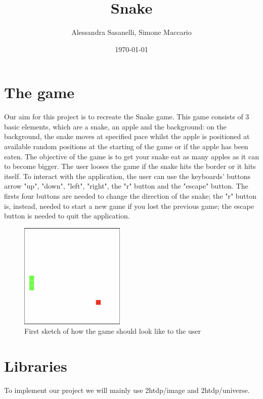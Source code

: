 \documentclass{article}
\title{Snake}
\author{Alessandra Sasanelli, Simone Maccario}
\date{\today}
\begin{document}
	\maketitle
	
	\section{The game}
	Our aim for this project is to recreate the Snake game.
	This game consists of 3 basic elements, which are a snake, an apple and the background: on the background, the snake moves at specified pace whilst the apple is positioned at available random positions at the starting of the game or if the apple has been eaten.
	The objective of the game is to get your snake eat as many apples as it can to become bigger. The user looses the game if the snake hits the border or it hits itself.
	To interact with the application, the user can use the keyboards' buttons arrow "up", "down", "left", "right", the "r" button and the "escape" button. 
	The firsts four buttons are needed to change the direction of the snake; the "r" button is, instead, needed to start a new game if you lost the previous game; the escape button is needed to quit the application.
	\begin{figure}[h!]
		\centering
		\includegraphics[width=5cm]{snake-game.png}
		\caption{First sketch of how the game should look like to the user}
	\end{figure}
	\section{Libraries}
	To implement our project we will mainly use 2htdp/image and 2htdp/universe.
\end{document}

